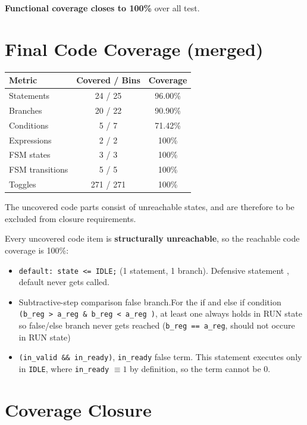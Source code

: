 \documentclass[11pt,a4paper]{article}
\begin{document}
{\noindent\textbf{Functional coverage closes to 100\%} over all test. 

\section{Final Code Coverage (merged)}

\begin{table}[H]
\centering
\small
\begin{tabular}{lcc}
\toprule
\textbf{Metric} & \textbf{Covered / Bins} & \textbf{Coverage} \\
\midrule
Statements        & 24 / 25   & 96.00\%  \\
Branches          & 20 / 22   & 90.90\%  \\
Conditions        & 5 / 7     & 71.42\%  \\
Expressions       & 2 / 2     & 100\%    \\
FSM states        & 3 / 3     & 100\%    \\
FSM transitions   & 5 / 5     & 100\%    \\
Toggles           & 271 / 271 & 100\%    \\
\bottomrule
\end{tabular}
\end{table}


The uncovered code parts consist of unreachable states, and are therefore to be excluded from closure requirements. 


Every uncovered code item is \textbf{structurally unreachable}, so the reachable
code coverage is 100\%:

\begin{itemize}
  \item \texttt{default: state <= IDLE;} (1 statement,
        1 branch). Defensive statement , default never gets called. 

        
  \item Subtractive-step comparison false branch.For the  if and else if condition  \texttt{(b\_reg > a\_reg \& b\_reg < a\_reg )}, at least one always holds in RUN state so false/else branch never gets reached (\texttt{b\_reg == a\_reg}, should not occure in RUN state)
  \item \texttt{(in\_valid \&\& in\_ready)}, \texttt{in\_ready} false term.
        This statement executes only in \texttt{IDLE}, where
        \texttt{in\_ready} $\equiv 1$ by definition, so the term cannot be 0.
\end{itemize}

\section{Coverage Closure}

}
\end{document}
